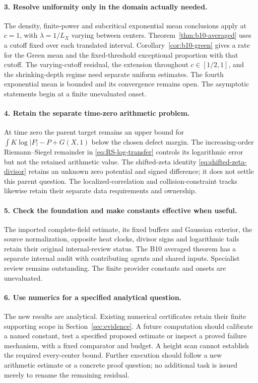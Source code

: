 \paragraph{3. Resolve uniformity only in the domain actually needed.}
The density, finite-power and subcritical exponential mean conclusions
apply at \(c=1\), with \(\lambda=1/L_X\) varying between centers.
Theorem~\ref{thm:b10-averaged} uses a cutoff fixed over each translated
interval. Corollary~\ref{cor:b10-green} gives a rate for the Green mean
and the fixed-threshold exceptional proportion with that cutoff.
The varying-cutoff residual, the extension throughout \(c\in[1/2,1]\),
and the shrinking-depth regime need separate uniform estimates.
The fourth exponential mean is bounded and its convergence remains
open. The asymptotic statements begin at a finite unevaluated onset.

\paragraph{4. Retain the separate time-zero arithmetic problem.}
At time zero the parent target remains an upper bound for
\(\int K\log|F|-P+G(X,1)\) below the chosen defect margin.
The increasing-order Riemann--Siegel remainder in
\eqref{eq:RS-log-transfer} controls its logarithmic error but not the
retained arithmetic value. The shifted-zeta identity
\eqref{eq:shifted-zeta-divisor} retains an unknown zero potential
and signed difference; it does not settle this parent question.
The localized-correlation and collision-constraint tracks likewise
retain their separate data requirements and ownership.

\paragraph{5. Check the foundation and make constants effective when useful.}
The imported complete-field estimate, its fixed buffers and Gaussian
exterior, the source normalization, opposite heat clocks, divisor
signs and logarithmic tails retain their original internal-review
status. The B10 averaged theorem has a separate internal audit with
contributing agents and shared inputs. Specialist review remains
outstanding. The finite provider constants and onsets are unevaluated.

\paragraph{6. Use numerics for a specified analytical question.}
The new results are analytical. Existing numerical certificates retain
their finite supporting scope in Section~\ref{sec:evidence}. A future
computation should calibrate a named constant, test a specified proposed
estimate or inspect a proved failure mechanism, with a fixed comparator
and budget. A height scan cannot establish the required every-center
bound. Further execution should follow a new arithmetic estimate or a
concrete proof question; no additional task is issued merely to rename
the remaining residual.
